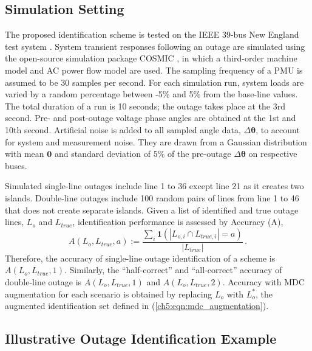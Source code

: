 \subsection{Simulation Setting}
The proposed identification scheme is tested on the IEEE 39-bus New England test system \cite{athay1979practical}. System transient responses following an outage are simulated using the open-source simulation package COSMIC \cite{Song2016}, in which a third-order machine model and AC power flow model are used. The sampling frequency of a PMU is assumed to be 30 samples per second. For each simulation run, system loads are varied by a random percentage between -5\% and 5\% from the base-line values. The total duration of a run is 10 seconds; the outage takes place at the 3rd second. Pre- and post-outage voltage phase angles are obtained at the 1st and 10th second. Artificial noise is added to all sampled angle data, $\Delta \boldsymbol{\theta}$, to account for system and measurement noise. They are drawn from a Gaussian distribution with mean $\mathbf{0}$ and standard deviation of $5\%$ of the pre-outage $\Delta\boldsymbol{\theta}$ on respective buses. 

Simulated single-line outages include line 1 to 36 except line 21 as it creates two islands. Double-line outages include 100 random pairs of lines from line 1 to 46 that does not create separate islands. Given a list of identified and true outage lines, $L_o$ and $L_{true}$, identification performance is assessed by Accuracy (A), 
\begin{equation}
\label{ch5:eqn:accuracy}
A(L_o, L_{true}, a):=\frac{\sum_i \mathbf{1}(\left| L_{o,i} \cap L_{true, i} \right| = a)}{\left| L_{true} \right|} \,.
\end{equation}
Therefore, the accuracy of single-line outage identification of a scheme is $A(L_o, L_{true}, 1)$. Similarly, the ``half-correct'' and ``all-correct'' accuracy of double-line outage is $A(L_o, L_{true}, 1)$ and $A(L_o, L_{true}, 2)$. Accuracy with MDC augmentation for each scenario is obtained by replacing $L_o$ with $L_o^*$, the augmented identification set defined in (\ref{ch5:eqn:mdc_augmentation}). 


\subsection{Illustrative Outage Identification Example}  

